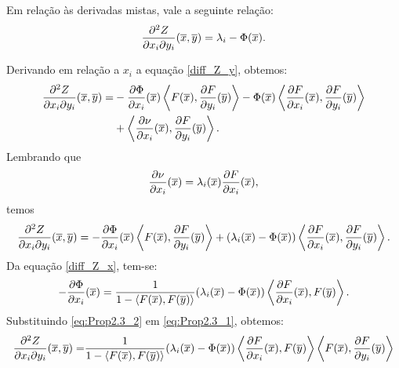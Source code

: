 \begin{proposicao}
Em rela\c c\~ao \`as derivadas mistas, vale a seguinte rela\c c\~ao:
\begin{equation}\label{diff_Z_x_y}
\frac{\partial^2 Z}{\partial x_i \partial y_i}(\overline{x},\overline{y}) = \lambda_i - \Phi(\overline{x}).
\end{equation}
\end{proposicao}
\begin{demonstracao}
Derivando em rela\c c\~ao  a $x_i$ a equação \eqref{diff_Z_y}, obtemos:
\begin{eqnarray*}
\begin{aligned}
\frac{\partial^2 Z}{\partial x_i \partial y_i}(\overline{x},\overline{y}) =  & 
-\frac{\partial \Phi}{\partial x_i}(\overline{x}) \left\langle F(\overline{x}), 
\frac{\partial F}{\partial y_i}(\overline{y}) \right\rangle - \Phi(\overline{x})
\left\langle \frac{\partial F}{\partial x_i}(\overline{x}), 
\frac{\partial F}{\partial y_i}(\overline{y}) \right\rangle \\
& + \left\langle \frac{\partial \nu}{\partial x_i}(\overline{x}), 
\frac{\partial F}{\partial y_i}(\overline{y}) \right\rangle.
\end{aligned}
\end{eqnarray*}	
Lembrando que 
\[
\frac{\partial \nu}{\partial x_i}(\overline{x}) = 
\lambda_i(\overline{x}) \frac{\partial F}{\partial x_i}(\overline{x}),
\]
temos
\begin{eqnarray} \label{eq:Prop2.3_1}
\frac{\partial^2 Z}{\partial x_i \partial y_i}(\overline{x},\overline{y}) = -\frac{\partial \Phi}{\partial x_i}(\overline{x}) \left\langle F(\overline{x}), \frac{\partial F}{\partial y_i}(\overline{y}) \right\rangle + (\lambda_i(\overline{x}) - \Phi(\overline{x})) \left\langle \frac{\partial F}{\partial x_i}(\overline{x}), \frac{\partial F}{\partial y_i}(\overline{y}) \right\rangle.
\end{eqnarray}	
Da equa\c c\~ao \eqref{diff_Z_x}, tem-se:
\begin{eqnarray} \label{eq:Prop2.3_2}
-\frac{\partial \Phi}{\partial x_i}(\overline{x}) = \frac{1}
{1 - \langle F(\overline{x}),F(\overline{y}) \rangle} (\lambda_i(\overline{x}) - \Phi(\overline{x})) 
\left\langle \frac{\partial F}{\partial x_i}(\overline{x}), F(\overline{y}) \right\rangle.
\end{eqnarray}
Substituindo \eqref{eq:Prop2.3_2} em \eqref{eq:Prop2.3_1}, 
obtemos:
\begin{eqnarray*}
\begin{aligned}
\frac{\partial^2 Z}{\partial x_i \partial y_i}(\xb,\yb) =&  \frac{1}{1 - \langle F(\xb),F(\yb) \rangle} (\lambda_i(\xb) - \Phi(\xb)) \left\langle \frac{\partial F}{\partial x_i}(\xb), F(\yb) \right\rangle  \left\langle F(\xb), \frac{\partial F}{\partial y_i}(\yb) \right\rangle \\

\end{aligned}
\end{eqnarray*}
\end{demonstracao}
